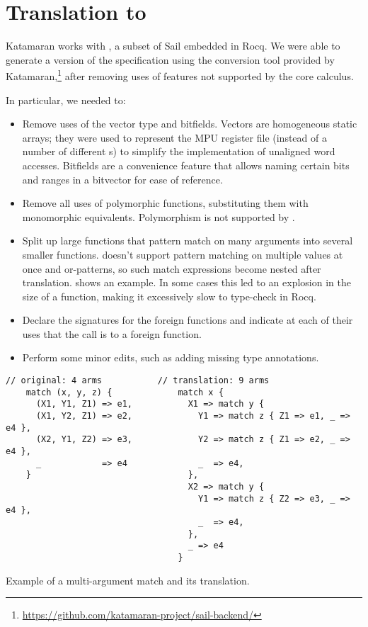\section{Translation to \texorpdfstring{\usail}{μSail}}
\label{sec:usail-translation}

Katamaran works with \usail, a subset of Sail embedded in Rocq. We were able to generate a \usail version of the specification using the conversion tool provided by Katamaran,\footnote{\url{https://github.com/katamaran-project/sail-backend/}} after removing uses of features not supported by the core calculus.

In particular, we needed to:
\begin{itemize}
\item Remove uses of the vector type and bitfields. Vectors are homogeneous static arrays; they were used to represent the MPU register file (instead of a number of different s) to simplify the implementation of unaligned word accesses. Bitfields are a convenience feature that allows naming certain bits and ranges in a bitvector for ease of reference.

\item Remove all uses of polymorphic functions, substituting them with monomorphic equivalents. Polymorphism is not supported by \usail.

\item Split up large functions that pattern match on many arguments into several smaller functions. \usail doesn't support pattern matching on multiple values at once and or-patterns, so such match expressions become nested after translation.  shows an example. In some cases this led to an explosion in the size of a \usail function, making it excessively slow to type-check in Rocq.

\item Declare the signatures for the foreign functions and indicate at each of their uses that the call is to a foreign function.

\item Perform some minor edits, such as adding missing type annotations.
\end{itemize}

\begin{listing}[tb]
  \begin{lstlisting}[language=sail]
    // original: 4 arms           // translation: 9 arms
    match (x, y, z) {             match x {
      (X1, Y1, Z1) => e1,           X1 => match y {
      (X1, Y2, Z1) => e2,             Y1 => match z { Z1 => e1, _ => e4 },
      (X2, Y1, Z2) => e3,             Y2 => match z { Z1 => e2, _ => e4 },
      _            => e4              _  => e4,
    }                               },
                                    X2 => match y {
                                      Y1 => match z { Z2 => e3, _ => e4 },
                                      _  => e4,
                                    },
                                    _ => e4
                                  }
  \end{lstlisting}
  \caption{Example of a multi-argument match and its translation.}
  \label{lst:match-explosion}
\end{listing}

